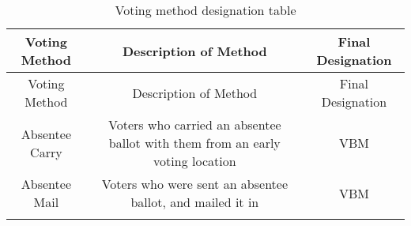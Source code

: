 \documentclass[12pt,twoside]{reedthesis}
\begin{document}
  \begin{longtable}[]{@{}ccc@{}}
  \caption{Voting method designation table
  \label{tab:voting_method}}\tabularnewline
  \toprule
  \begin{minipage}[b]{0.13\columnwidth}\centering\strut
  Voting Method\strut
  \end{minipage} & \begin{minipage}[b]{0.62\columnwidth}\centering\strut
  Description of Method\strut
  \end{minipage} & \begin{minipage}[b]{0.16\columnwidth}\centering\strut
  Final Designation\strut
  \end{minipage}\tabularnewline
  \midrule
  \endfirsthead
  \toprule
  \begin{minipage}[b]{0.13\columnwidth}\centering\strut
  Voting Method\strut
  \end{minipage} & \begin{minipage}[b]{0.62\columnwidth}\centering\strut
  Description of Method\strut
  \end{minipage} & \begin{minipage}[b]{0.16\columnwidth}\centering\strut
  Final Designation\strut
  \end{minipage}\tabularnewline
  \midrule
  \endhead
  \begin{minipage}[t]{0.13\columnwidth}\centering\strut
  Absentee Carry\strut
  \end{minipage} & \begin{minipage}[t]{0.62\columnwidth}\centering\strut
  Voters who carried an absentee ballot with them from an early voting
  location\strut
  \end{minipage} & \begin{minipage}[t]{0.16\columnwidth}\centering\strut
  VBM\strut
  \end{minipage}\tabularnewline
  \begin{minipage}[t]{0.13\columnwidth}\centering\strut
  Absentee Mail\strut
  \end{minipage} & \begin{minipage}[t]{0.62\columnwidth}\centering\strut
  Voters who were sent an absentee ballot, and mailed it in\strut
  \end{minipage} & \begin{minipage}[t]{0.16\columnwidth}\centering\strut
  VBM\strut
  \end{minipage}\tabularnewline
  \begin{minipage}[t]{0.13\columnwidth}\centering\strut

\end{minipage}
\end{longtable}
\end{document}
